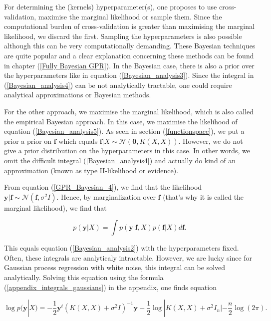 \documentclass[12pt,a4paper,oneside]{book}
\begin{document}
For determining the (kernels) hyperparameter(s), one proposes to use cross-validation, maximise the marginal likelihood or sample them. Since the computational burden of cross-validation is greater than maximising the marginal likelihood, we discard the first. Sampling the hyperparameters is also possible although this can be very computationally demanding. These Bayesian techniques are quite popular and a clear explanation concerning these methods can be found in chapter (\ref{Fully Bayesian GPR}). In the Bayesian case, there is also a prior over the hyperparameters like in equation (\ref{Bayesian_analysis3}). Since the integral in (\ref{Bayesian_analysis4}) can be not analytically tractable, one could require analytical approximations or Bayesian methods.  

For the other approach, we maximise the marginal likelihood, which is also called the empirical Bayesian approach. In this case, we maximise  the likelihood of equation (\ref{Bayesian_analysis5}). As seen in section (\ref{functionspace}), we put a prior a prior on $\bm{f}$ which equals $\bm{f}|X \sim \mathcal{N}(\bm{0},K(X,X))$. However, we do not give a prior distribution on the hyperparameters in this case. In other words, we omit the difficult integral (\ref{Bayesian_analysis4}) and actually do kind of an approximation (known as type II-likelihood or evidence). 

From equation (\ref{GPR_Bayesian_4}), we find that the likelihood $\bm{y} | \bm{f} \sim \mathcal{N}(\bm{f},\sigma^2 I)$. Hence, by marginalization over $\bm{f}$ (that's why it is called the marginal likelihood), we find that 

\begin{equation}
p(\bm{y}|X) = \int p(\bm{y}|\bm{f},X)p(\bm{f}|X) d\bm{f}.
\end{equation}

This equals equation (\ref{Bayesian_analysis2}) with the hyperparameters fixed. Often, these integrals are analyticaly intractable. However, we are lucky since for Gaussian process regression with white noise, this integral can be solved analytically. Solving this equation using the formula (\ref{appendix_integrals_gaussians}) in the appendix, one finds equation

\begin{equation}\label{log_marg_llh}
\log p(\bm{y}|X) = -\dfrac{1}{2} \bm{y}^t (K(X,X) + \sigma^2 I)^{-1} \bm{y} -\dfrac{1}{2} \log |K(X,X) + \sigma^2 I_n| - \dfrac{n}{2}  \log(2 \pi).
\end{equation}
\end{document}
